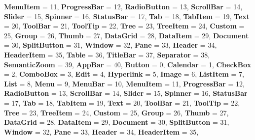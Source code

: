 \begin{DoxyCompactItemize}
{\bfseries Menu\+Item} = 11, 
{\bfseries Progress\+Bar} = 12, 
{\bfseries Radio\+Button} = 13, 
{\bfseries Scroll\+Bar} = 14, 
\newline
{\bfseries Slider} = 15, 
{\bfseries Spinner} = 16, 
{\bfseries Status\+Bar} = 17, 
{\bfseries Tab} = 18, 
\newline
{\bfseries Tab\+Item} = 19, 
{\bfseries Text} = 20, 
{\bfseries Tool\+Bar} = 21, 
{\bfseries Tool\+Tip} = 22, 
\newline
{\bfseries Tree} = 23, 
{\bfseries Tree\+Item} = 24, 
{\bfseries Custom} = 25, 
{\bfseries Group} = 26, 
\newline
{\bfseries Thumb} = 27, 
{\bfseries Data\+Grid} = 28, 
{\bfseries Data\+Item} = 29, 
{\bfseries Document} = 30, 
\newline
{\bfseries Split\+Button} = 31, 
{\bfseries Window} = 32, 
{\bfseries Pane} = 33, 
{\bfseries Header} = 34, 
\newline
{\bfseries Header\+Item} = 35, 
{\bfseries Table} = 36, 
{\bfseries Title\+Bar} = 37, 
{\bfseries Separator} = 38, 
\newline
{\bfseries Semantic\+Zoom} = 39, 
{\bfseries App\+Bar} = 40, 
{\bfseries Button} = 0, 
{\bfseries Calendar} = 1, 
\newline
{\bfseries Check\+Box} = 2, 
{\bfseries Combo\+Box} = 3, 
{\bfseries Edit} = 4, 
{\bfseries Hyperlink} = 5, 
\newline
{\bfseries Image} = 6, 
{\bfseries List\+Item} = 7, 
{\bfseries List} = 8, 
{\bfseries Menu} = 9, 
\newline
{\bfseries Menu\+Bar} = 10, 
{\bfseries Menu\+Item} = 11, 
{\bfseries Progress\+Bar} = 12, 
{\bfseries Radio\+Button} = 13, 
\newline
{\bfseries Scroll\+Bar} = 14, 
{\bfseries Slider} = 15, 
{\bfseries Spinner} = 16, 
{\bfseries Status\+Bar} = 17, 
\newline
{\bfseries Tab} = 18, 
{\bfseries Tab\+Item} = 19, 
{\bfseries Text} = 20, 
{\bfseries Tool\+Bar} = 21, 
\newline
{\bfseries Tool\+Tip} = 22, 
{\bfseries Tree} = 23, 
{\bfseries Tree\+Item} = 24, 
{\bfseries Custom} = 25, 
\newline
{\bfseries Group} = 26, 
{\bfseries Thumb} = 27, 
{\bfseries Data\+Grid} = 28, 
{\bfseries Data\+Item} = 29, 
\newline
{\bfseries Document} = 30, 
{\bfseries Split\+Button} = 31, 
{\bfseries Window} = 32, 
{\bfseries Pane} = 33, 
\newline
{\bfseries Header} = 34, 
{\bfseries Header\+Item} = 35, 

\end{DoxyCompactItemize}
